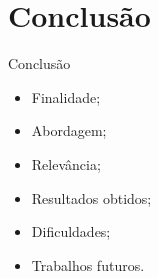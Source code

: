 \section{Conclusão}

\begin{frame}{Conclusão}
    \begin{itemize}
        \item Finalidade; \vspace{0.5cm}
        \item Abordagem; \vspace{0.5cm}
        \item Relevância; \vspace{0.5cm}
        \item Resultados obtidos; \vspace{0.5cm}
        \item Dificuldades; \vspace{0.5cm}
        \item Trabalhos futuros. \vspace{0.5cm}
    \end{itemize}
\end{frame}